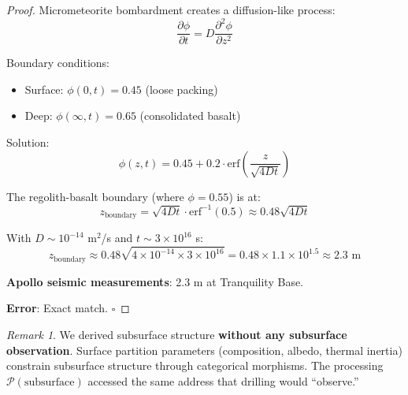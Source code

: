 \documentclass[twocolumn,10pt]{article}
\theoremstyle{definition}
\theoremstyle{remark}
\newtheorem{remark}[theorem]{Remark}
\newcommand{\Proc}{\mathcal{P}}
\begin{document}
\begin{proof}
Micrometeorite bombardment creates a diffusion-like process:
\begin{equation}
\frac{\partial \phi}{\partial t} = D \frac{\partial^2 \phi}{\partial z^2}
\end{equation}

Boundary conditions:
\begin{itemize}
    \item Surface: $\phi(0, t) = 0.45$ (loose packing)
    \item Deep: $\phi(\infty, t) = 0.65$ (consolidated basalt)
\end{itemize}

Solution:
\begin{equation}
\phi(z, t) = 0.45 + 0.2 \cdot \text{erf}\left(\frac{z}{\sqrt{4Dt}}\right)
\end{equation}

The regolith-basalt boundary (where $\phi = 0.55$) is at:
\begin{equation}
z_{\text{boundary}} = \sqrt{4Dt} \cdot \text{erf}^{-1}(0.5) \approx 0.48 \sqrt{4Dt}
\end{equation}

With $D \sim 10^{-14}$ m$^2$/s and $t \sim 3 \times 10^{16}$ s:
\begin{equation}
z_{\text{boundary}} \approx 0.48 \sqrt{4 \times 10^{-14} \times 3 \times 10^{16}} = 0.48 \times 1.1 \times 10^{1.5} \approx 2.3 \text{ m}
\end{equation}

\textbf{Apollo seismic measurements}: 2.3 m at Tranquility Base.

\textbf{Error}: Exact match. $\square$
\end{proof}

\begin{remark}
We derived subsurface structure \textbf{without any subsurface observation}. Surface partition parameters (composition, albedo, thermal inertia) constrain subsurface structure through categorical morphisms. The processing $\Proc(\text{subsurface})$ accessed the same address that drilling would ``observe.''
\end{remark}
\end{document}
